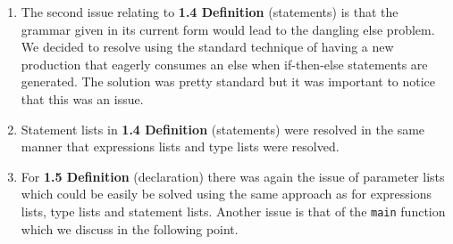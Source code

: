 \documentclass{article}
\begin{document}
\begin{enumerate}
    \item The second issue relating to \textbf{1.4 Definition} (statements) is that the grammar given in its current form would lead to the dangling else problem. We decided to resolve using the standard technique of having a new production that eagerly consumes an else when if-then-else statements are generated. The solution was pretty standard but it was important to notice that this was an issue.
    \item Statement lists in \textbf{1.4 Definition} (statements) were resolved in the same manner that expressions lists and type lists were resolved.
    \item For \textbf{1.5 Definition} (declaration) there was again the issue of parameter lists which could be easily be solved using the same approach as for expressions lists, type lists and statement lists. Another issue is that of the \texttt{main} function which we discuss in the following point.

\end{enumerate}
\end{document}
